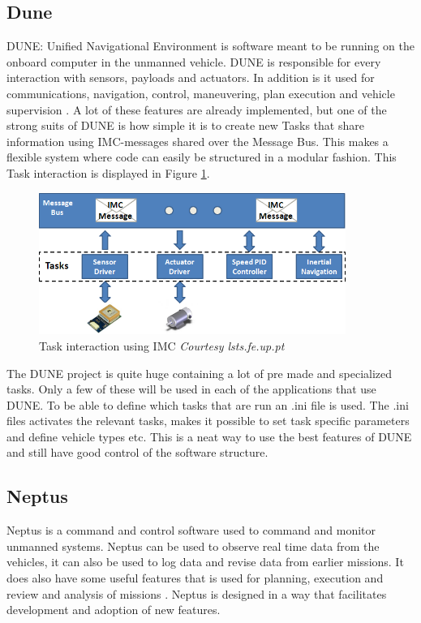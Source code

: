 \subsection{Dune}
DUNE: Unified Navigational Environment is software meant to be running on the onboard computer in the unmanned vehicle. DUNE is responsible for every interaction with sensors, payloads and actuators. In addition is it used for communications, navigation, control, maneuvering, plan execution and vehicle supervision \citep{DUNE}. A lot of these features are already implemented, but one of the strong suits of DUNE is how simple it is to create new Tasks that share information using IMC-messages shared over the Message Bus. This makes a flexible system where code can easily be structured in a modular fashion. This Task interaction is displayed in Figure \ref{dune_imc}.
\begin{figure}[H]
\centering
\includegraphics[width = 10cm]{fig/description/dune_imc.png}
\caption{Task interaction using IMC \textit{Courtesy lsts.fe.up.pt}}
\label{dune_imc}
\end{figure}
\noindent
The DUNE project is quite huge containing a lot of pre made and specialized tasks. Only a few of these will be used in each of the applications that use DUNE. To be able to define which tasks that are run an .ini file is used. The .ini files activates the relevant tasks, makes it possible to set task specific parameters and define vehicle types etc. This is a neat way to use the best features of DUNE and still have good control of the software structure.
\subsection{Neptus}
Neptus is a command and control software used to command and monitor unmanned systems. Neptus can be used to observe real time data from the vehicles, it can also be used to log data and revise data from earlier missions. It does also have some useful features that is used for planning, execution and review and analysis of missions \citep{neptus}. Neptus is designed in a way that facilitates development and adoption of new features.
